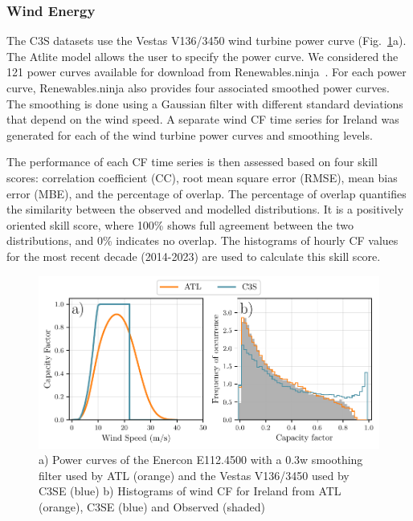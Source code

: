\documentclass[preprint, 12pt]{elsarticle}
\begin{document}
\subsubsection{Wind Energy}
\label{sec:wind_verification}

The C3S datasets use the Vestas V136/3450 wind turbine power curve (Fig.~\ref{fig:power_curve}a). The Atlite model allows the user to specify the power curve. We considered the 121 power curves available for download from Renewables.ninja~\citep{staffell2016wake}. For each power curve, Renewables.ninja also provides four associated smoothed power curves. The smoothing is done using a Gaussian filter with different standard deviations that depend on the wind speed. A separate wind CF time series for Ireland was generated for each of the wind turbine power curves and smoothing levels.

The performance of each CF time series is then assessed based on four skill scores: correlation coefficient (CC), root mean square error (RMSE), mean bias error (MBE), and the percentage of overlap. The percentage of overlap quantifies the similarity between the observed and modelled distributions. It is a positively oriented skill score, where 100\% shows full agreement between the two distributions, and 0\% indicates no overlap. The histograms of hourly CF values for the most recent decade (2014-2023) are used to calculate this skill score.

\begin{figure}[!ht]
	\centering
	\includegraphics[width=\textwidth]{verification_power_curve.pdf}
	\caption{a) Power curves of the Enercon E112.4500 with a 0.3w smoothing filter used by ATL (orange) and the Vestas V136/3450 used by C3SE (blue) b) Histograms of wind CF for Ireland from ATL (orange), C3SE (blue) and Observed (shaded)}
	\label{fig:power_curve}
\end{figure}
\end{document}
